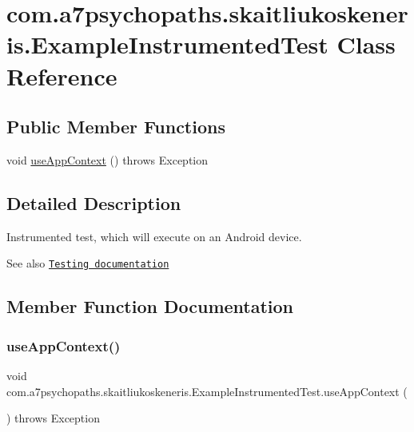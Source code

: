 \hypertarget{classcom_1_1a7psychopaths_1_1skaitliukoskeneris_1_1_example_instrumented_test}{}\section{com.\+a7psychopaths.\+skaitliukoskeneris.\+Example\+Instrumented\+Test Class Reference}
\label{classcom_1_1a7psychopaths_1_1skaitliukoskeneris_1_1_example_instrumented_test}
\subsection*{Public Member Functions}
\begin{DoxyCompactItemize}
\item 
void \mbox{\hyperlink{classcom_1_1a7psychopaths_1_1skaitliukoskeneris_1_1_example_instrumented_test_af7fadc1b6fc2996ec2de60b1bd3cd414}{use\+App\+Context}} ()  throws Exception 
\end{DoxyCompactItemize}


\subsection{Detailed Description}
Instrumented test, which will execute on an Android device.

\begin{DoxySeeAlso}{See also}
\href{http://d.android.com/tools/testing}{\tt Testing documentation} 
\end{DoxySeeAlso}


\subsection{Member Function Documentation}
\mbox{\label{classcom_1_1a7psychopaths_1_1skaitliukoskeneris_1_1_example_instrumented_test_af7fadc1b6fc2996ec2de60b1bd3cd414}} 
\subsubsection{\texorpdfstring{use\+App\+Context()}{useAppContext()}}
{\footnotesize\ttfamily void com.\+a7psychopaths.\+skaitliukoskeneris.\+Example\+Instrumented\+Test.\+use\+App\+Context (\begin{DoxyParamCaption}{ }\end{DoxyParamCaption}) throws Exception}



